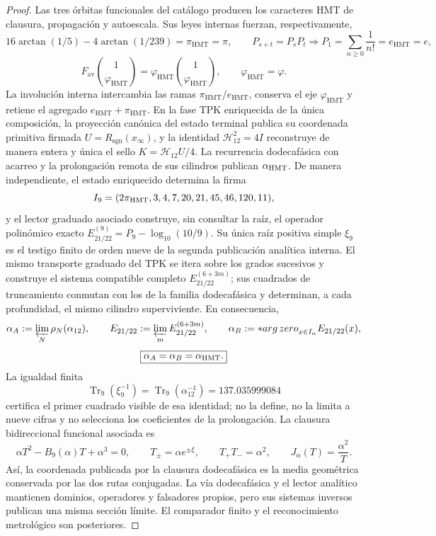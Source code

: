 \begin{proof}
Las tres órbitas funcionales del catálogo producen los caracteres HMT de
clausura, propagación y autoescala. Sus leyes internas fuerzan,
respectivamente,
\[
16\arctan(1/5)-4\arctan(1/239)=\pi_{\mathrm{HMT}}=\pi,
\qquad
P_{s+t}=P_sP_t\Rightarrow
P_1=\sum_{n\ge0}\frac1{n!}=e_{\mathrm{HMT}}=e,
\]
\[
F_{\mathrm{av}}\binom1{\varphi_{\mathrm{HMT}}}
=\varphi_{\mathrm{HMT}}\binom1{\varphi_{\mathrm{HMT}}},
\qquad \varphi_{\mathrm{HMT}}=\varphi.
\]
La involución interna intercambia las ramas
\(\pi_{\mathrm{HMT}}/e_{\mathrm{HMT}}\), conserva el eje
\(\varphi_{\mathrm{HMT}}\) y retiene el agregado
\(e_{\mathrm{HMT}}+\pi_{\mathrm{HMT}}\). En la fase TPK enriquecida de la
única composición, la proyección canónica del estado terminal publica su coordenada primitiva
firmada
\(U=R_{\mathrm{sgn}}(x_\infty)\), y la identidad
\(\mathcal H_{12}^2=4I\) reconstruye de manera entera y única el sello
\(K=\mathcal H_{12}U/4\). La recurrencia dodecafásica con acarreo y la
prolongación remota de sus cilindros publican \(\alpha_{\rm HMT}\). De
manera independiente, el estado enriquecido determina la firma
\[
 \mathcal I_9=(2\pi_{\rm HMT},3,4,7,20,21,45,46,120,11),
\]
y el lector graduado asociado construye, sin consultar la raíz, el operador
polinómico exacto
\(E_{21/22}^{(9)}=P_9-\log_{10}(10/9)\). Su única raíz positiva simple
\(\xi_9\) es el testigo finito de orden nueve de la segunda publicación
analítica interna. El mismo transporte graduado del TPK se itera sobre los
grados sucesivos y construye el sistema compatible completo
\(E_{21/22}^{(6+3m)}\); sus cuadrados de truncamiento conmutan con los de la
familia dodecafásica y determinan, a cada profundidad, el mismo cilindro
superviviente. En consecuencia,
\[
 \alpha_A:=\varprojlim_N\rho_N(\alpha_{12}),\qquad
 E_{21/22}:=\varprojlim_mE_{21/22}^{(6+3m)},\qquad
 \alpha_B:=\operatorname*{arg\,zero}_{x\in I_\alpha}E_{21/22}(x),
\]
\[
 \boxed{\alpha_A=\alpha_B=\alpha_{\rm HMT}.}
\]
La igualdad finita
\[
 \operatorname{Tr}_9(\xi_9^{-1})
 =\operatorname{Tr}_9(\alpha_{12}^{-1})=137.035999084
\]
certifica el primer cuadrado visible de esa identidad; no la define, no la
limita a nueve cifras y no selecciona los coeficientes de la prolongación.
La clausura bidireccional funcional asociada es
\[
\alpha T^2-B_9(\alpha)T+\alpha^3=0,
\qquad
T_\pm=\alpha e^{\pm\xi},
\qquad
T_+T_-=\alpha^2,
\qquad
J_\alpha(T)=\frac{\alpha^2}{T}.
\]
Así, la coordenada publicada por la clausura dodecafásica es la media
geométrica conservada por las dos rutas conjugadas. La vía dodecafásica y el
lector analítico mantienen dominios, operadores y falsadores propios, pero
sus sistemas inversos publican una misma sección límite. El comparador
finito y el reconocimiento metrológico son posteriores.


\end{proof}
